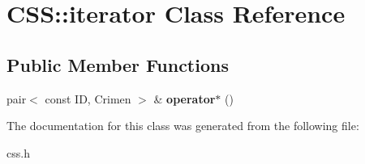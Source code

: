 \hypertarget{classCSS_1_1iterator}{}\section{C\+S\+S\+:\+:iterator Class Reference}
\label{classCSS_1_1iterator}
\subsection*{Public Member Functions}
\begin{DoxyCompactItemize}
\item 
\hypertarget{classCSS_1_1iterator_aa9b3c5ff091daa3f6e234ce403627228}{}pair$<$ const I\+D, Crimen $>$ \& {\bfseries operator$\ast$} ()\label{classCSS_1_1iterator_aa9b3c5ff091daa3f6e234ce403627228}

\end{DoxyCompactItemize}


The documentation for this class was generated from the following file\+:\begin{DoxyCompactItemize}
\item 
css.\+h\end{DoxyCompactItemize}
